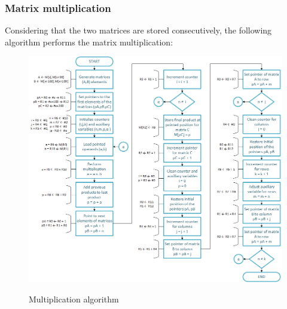 \documentclass[]{article}
\begin{document}
\subsubsection{Matrix multiplication}
Considering that the two matrices are stored consecutively, the following algorithm performs the matrix multiplication:
\begin{figure}[H]
	\caption{Multiplication algorithm}
	\centering
	\includegraphics[width=1\textwidth]{mult_algorithm}
	\label{fig:13}
\end{figure}
\end{document}

